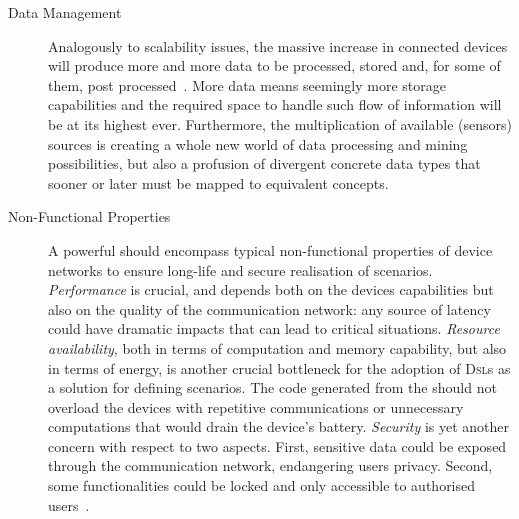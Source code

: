 \begin{description}
	\item[Data Management] Analogously to scalability issues, the massive increase in connected devices will produce more and more data to be processed, stored and, for some of them, post processed~\cite{lee-15}. More data means seemingly more storage capabilities and the required space to handle such flow of information will be at its highest ever. Furthermore, the multiplication of available (sensors) sources is creating a whole new world of data processing and mining possibilities, but also a profusion of divergent concrete data types that sooner or later must be mapped to equivalent concepts.
	
	\item[Non-Functional Properties] A powerful \DSL should encompass typical non-functional properties of device networks to ensure long-life and secure realisation of scenarios. \emph{Performance} is crucial, and depends both on the devices capabilities but also on the quality of the communication network: any source of latency could have dramatic impacts that can lead to critical situations. \emph{Resource availability}, both in terms of computation and memory capability, but also in terms of energy, is another crucial bottleneck for the adoption of \textsc{Dsl}s as a solution for defining scenarios. The code generated from the \DSL should not overload the devices with repetitive communications or unnecessary computations that would drain the device's battery. \emph{Security} is yet another concern with respect to two aspects. First, sensitive data could be exposed through the communication network, endangering users privacy. Second, some functionalities could be locked and only accessible to authorised users~\cite{tan-10}.
\end{description}